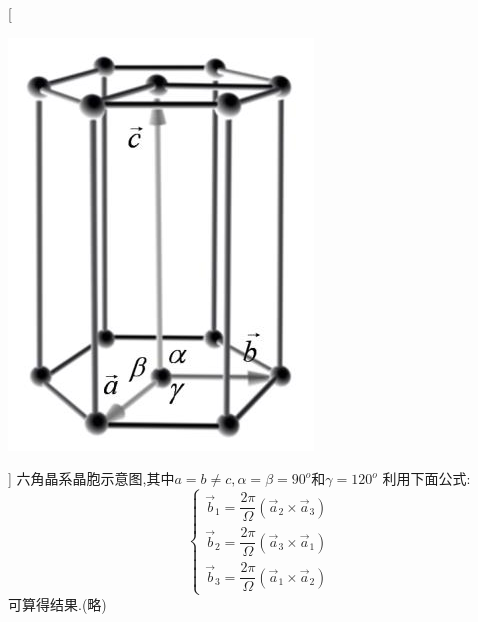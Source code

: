 \documentclass[UTF8,10pt,a4paper,oneside]{ctexart}
\begin{document}
        [\begin{center}
            \includegraphics{picture/3-5.png}
        \end{center}]
       {六角晶系晶胞示意图,其中$a=b\ne c ,\alpha=\beta=90^o$和$\gamma=120^o$
        利用下面公式:
        \begin{equation}
            \left\{\begin{array}{l}
            \vec{b}_{1}=\dfrac{2 \pi}{\Omega}\left(\vec{a}_{2} \times \vec{a}_{3}\right) \\
            \vec{b}_{2}=\dfrac{2 \pi}{\Omega}\left(\vec{a}_{3} \times \vec{a}_{1}\right)  \\
            \vec{b}_{3}=\dfrac{2 \pi}{\Omega}\left(\vec{a}_{1} \times \vec{a}_{2}\right)
            \end{array}\right.
            \tag{3.5.1} \label{351}
        \end{equation}
        可算得结果.(略)}
\end{document}
